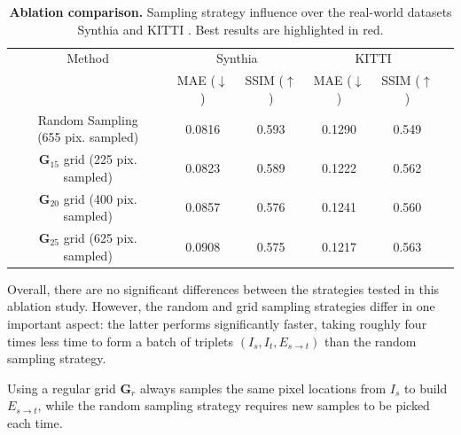 \begin{table}[h!]
    \caption{\textbf{Ablation comparison.} Sampling strategy influence over the real-world datasets Synthia \citep{ros2016synthia} and KITTI \citep{geiger2012we}. Best results are highlighted in \colorbox{red!25}{red}. }
    \label{tab:3}
    \begin{center}%
    \begin{adjustbox}{width =\linewidth}
    \begin{tabular}[h]{c||ccccc}
    \hline
      Method & \multicolumn{2}{c}{Synthia} & \multicolumn{2}{c}{KITTI} \\
      &  MAE ($\downarrow$) & SSIM ($\uparrow$) & MAE ($\downarrow$) & SSIM ($\uparrow$) \\
    \hline
    \makecell{ Random Sampling \\ \footnotesize{(655 pix. sampled)}}& \cellcolor{red!25}0.0816 & \cellcolor{red!25}0.593 & 0.1290 & 0.549   \\ \hline
\makecell{$\textbf{G}_{15}$ grid \\ \footnotesize{(225 pix. sampled)}} & 0.0823 & 0.589 & 0.1222 & 0.562   \\ \hline
\makecell{$\textbf{G}_{20}$ grid \\ \footnotesize{(400 pix. sampled)}} & 0.0857 & 0.576 & 0.1241 & 0.560  \\ \hline
\makecell{$\textbf{G}_{25}$ grid \\ \footnotesize{(625 pix. sampled)}} & 0.0908 & 0.575 & \cellcolor{red!25}0.1217 & \cellcolor{red!25}0.563   \\ 
    \hline 
    \end{tabular}
    \end{adjustbox}
    \end{center}
    \end{table}


Overall, there are no significant differences between the strategies tested in this ablation study.  However, the random and grid sampling strategies differ in one important aspect: the latter performs significantly faster, taking roughly four times less time to form a batch of triplets $\left(I_{s},I_{t},E_{s\xrightarrow{}t}\right)$ than the random sampling strategy. \newline

Using a regular grid $\textbf{G}_{r}$ always samples the same pixel locations from $I_s$ to build  $E_{s\xrightarrow{}t}$, while the random sampling strategy requires new samples to be picked each time.  

